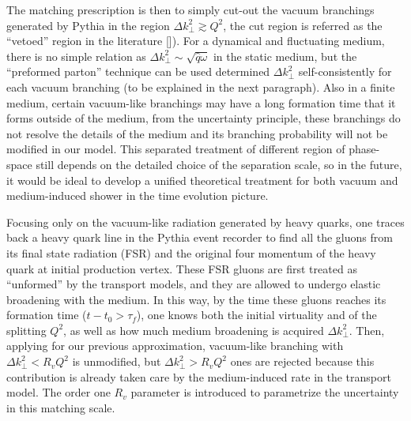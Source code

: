 The matching prescription is then to simply cut-out the vacuum branchings generated by Pythia in the region $\Delta k_\perp^2 \gtrsim Q^2$, the cut region is referred as the ``vetoed'' region in the literature []).
For a dynamical and fluctuating medium, there is no simple relation as $\Delta k_\perp^2\sim \sqrt{\hat{q}\omega}$ in the static medium, but the ``preformed parton'' technique can be used determined $\Delta k_\perp^2$ self-consistently for each vacuum branching (to be explained in the next paragraph).
Also in a finite medium, certain vacuum-like branchings may have a long formation time that it forms outside of the medium, from the uncertainty principle, these branchings do not resolve the details of the medium and its branching probability will not be modified in our model.
This separated treatment of different region of phase-space still depends on the detailed choice of the separation scale, so in the future, it would be ideal to develop a unified theoretical treatment for both vacuum and medium-induced shower in the time evolution picture.

Focusing only on the vacuum-like radiation generated by heavy quarks, one traces back a heavy quark line in the Pythia event recorder to find all the gluons from its final state radiation (FSR) and the original four momentum of the heavy quark at initial production vertex.
These FSR gluons are first treated as ``unformed'' by the transport models, and they are allowed to undergo elastic broadening with the medium.
In this way, by the time these gluons reaches its formation time ($t-t_0>\tau_f$), one knows both the initial virtuality and of the splitting $Q^2$, as well as how much medium broadening is acquired $\Delta k_\perp^2$.
Then, applying for our previous approximation, vacuum-like branching with 
$\Delta k_\perp^2 < R_v Q^2$ is unmodified, but $\Delta k_\perp^2 > R_v Q^2$ ones are rejected because this contribution is already taken care by the medium-induced rate in the transport model.
The order one $R_v$ parameter is introduced to parametrize the uncertainty in this matching scale.

